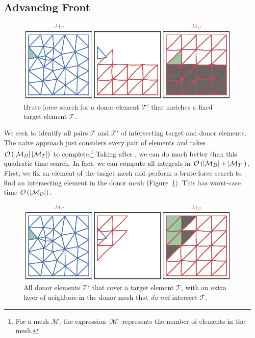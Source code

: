\subsection{Advancing Front}\label{subsec:advancing-front}

\begin{figure}
  \includegraphics{../images/solution-transfer/main_figure13.pdf}
  \centering
  \captionsetup{width=.75\linewidth}
  \caption{Brute force search for a donor element \(\mathcal{T}'\) that matches
    a fixed target element \(\mathcal{T}\).}
  \label{fig:target-elt-brute-force}
\end{figure}

We seek to identify all pairs \(\mathcal{T}\) and \(\mathcal{T}'\) of
intersecting target and donor elements. The na\"{i}ve approach just
considers every pair
of elements and takes \(\mathcal{O}\left(\left|\mathcal{M}_D\right|
\left|\mathcal{M}_T\right|\right)\) to complete.\footnote{For a mesh \(\mathcal{M}\),
the expression \(\left|\mathcal{M}\right|\) represents the number of elements
in the mesh.} Taking after \cite{Farrell2011}, we can do much better than this
quadratic time search. In fact, we can compute all integrals in
\(\mathcal{O}\left(\left|\mathcal{M}_D\right| + \left|\mathcal{M}_T\right|\right)\).
First, we fix an element of the target mesh and perform a brute-force search
to find an intersecting element in the donor mesh
(Figure~\ref{fig:target-elt-brute-force}). This has worst-case time
\(\mathcal{O}\left(\left|\mathcal{M}_D\right|\right)\).

\begin{figure}
  \includegraphics{../images/solution-transfer/main_figure14.pdf}
  \centering
  \captionsetup{width=.75\linewidth}
  \caption{All donor elements \(\mathcal{T}'\) that cover a target element
    \(\mathcal{T}\), with an extra layer of neighbors in the donor mesh
    that \emph{do not} intersect \(\mathcal{T}\).}
  \label{fig:target-elt-overlap-extra-layer}
\end{figure}

